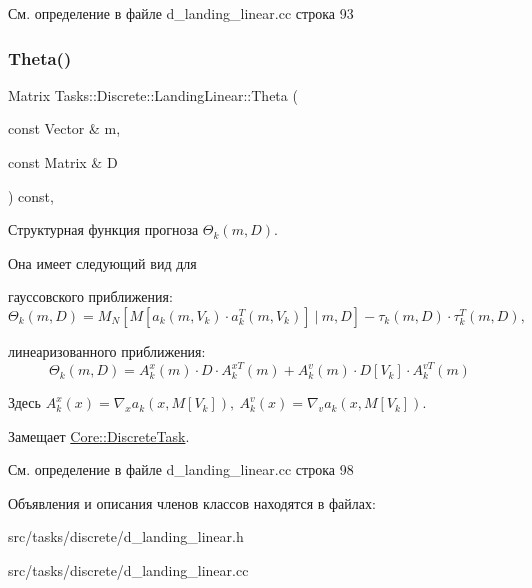 См. определение в файле d\+\_\+landing\+\_\+linear.\+cc строка 93

\hypertarget{class_tasks_1_1_discrete_1_1_landing_linear_a88dda707914dea5698748f445563400f}{}\label{class_tasks_1_1_discrete_1_1_landing_linear_a88dda707914dea5698748f445563400f} 
\subsubsection{\texorpdfstring{Theta()}{Theta()}}
{\footnotesize\ttfamily Matrix Tasks\+::\+Discrete\+::\+Landing\+Linear\+::\+Theta (\begin{DoxyParamCaption}\item[{const Vector \&}]{m,  }\item[{const Matrix \&}]{D }\end{DoxyParamCaption}) const\hspace{0.3cm}{\ttfamily [override]}, {\ttfamily [virtual]}}



Структурная функция прогноза $\Theta_k(m, D)$. 

Она имеет следующий вид для


\begin{DoxyItemize}
\item гауссовского приближения\+: \[\Theta_k(m, D) = M_N[M[a_k(m, V_k)\cdot a_k^T(m, V_k)]\ |\ m, D] - \tau_k(m,D) \cdot \tau_k^T(m, D),\]
\item линеаризованного приближения\+: \[\Theta_k(m, D) = A_k^x(m) \cdot D \cdot A_k^{xT}(m) + A_k^v(m) \cdot D[V_k] \cdot A_k^{v T}(m)\]
\end{DoxyItemize}

Здесь $A_k^x(x) = \nabla_x a_k(x,M[V_k]),\ A_k^v(x) = \nabla_v a_k(x,M[V_k])$. 

Замещает \hyperlink{class_core_1_1_discrete_task_a18906155257c5febd937f2f0c633e5ed}{Core\+::\+Discrete\+Task}.



См. определение в файле d\+\_\+landing\+\_\+linear.\+cc строка 98



Объявления и описания членов классов находятся в файлах\+:\begin{DoxyCompactItemize}
\item 
src/tasks/discrete/d\+\_\+landing\+\_\+linear.\+h\item 
src/tasks/discrete/d\+\_\+landing\+\_\+linear.\+cc\end{DoxyCompactItemize}
